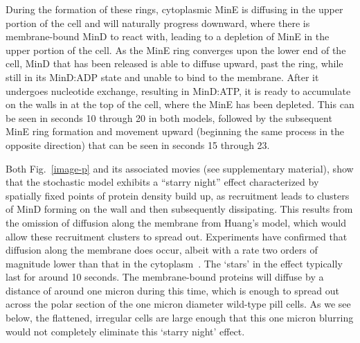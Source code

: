 \documentclass[10pt,letterpaper]{article}
\newcommand{\fixme}[1]{\red{[#1]}}
\newcommand{\red}[1]{{\bf \color{red} #1}}
\begin{document}
During the formation of these rings, cytoplasmic MinE is diffusing in
the upper portion of the cell and will naturally progress downward,
where there is membrane-bound MinD to react with, leading to a
depletion of MinE in the upper portion of the cell.  As the MinE ring
converges upon the lower end of the cell, MinD that has been released
is able to diffuse upward, past the ring, while still in its MinD:ADP
state and unable to bind to the membrane.  After it undergoes
nucleotide exchange, resulting in MinD:ATP, it is ready to accumulate
on the walls in at the top of the cell, where the MinE has been
depleted.  This can be seen in seconds 10 through 20 in both models,
followed by the subsequent MinE ring formation and movement upward
(beginning the same process in the opposite direction) that can be
seen in seconds 15 through 23.

Both Fig.~\ref{image-p} and its associated movies (see supplementary
material), show that the stochastic model exhibits a ``starry night''
effect characterized by spatially fixed points of protein density
build up, as recruitment leads to clusters of MinD forming on the wall
and then subsequently dissipating.  This results from the omission of
diffusion along the membrane from Huang's model, which would allow
these recruitment clusters to spread out.  Experiments have confirmed
that diffusion along the membrane does occur, albeit with a rate two
orders of magnitude lower than that in the
cytoplasm~\cite{meacci2006mobility}.  The `stars' in the effect typically
last for around 10 seconds. The membrane-bound proteins will diffuse
by a distance of around one micron during this time, which is enough
to spread out across the polar section of the one micron diameter
wild-type pill cells.  As we see below, the flattened, irregular cells
are large enough that this one micron blurring would not completely
eliminate this `starry night' effect.

\end{document}
